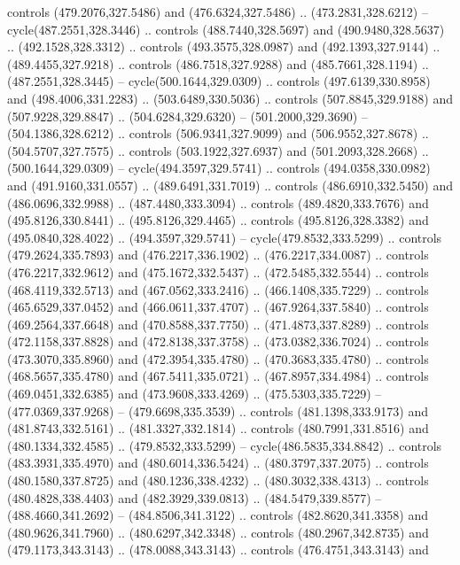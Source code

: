 \begin{scope}[cm={{1.25,0.0,0.0,-1.25,(0.0,743.43331)}}]
    controls (479.2076,327.5486) and (476.6324,327.5486) .. (473.2831,328.6212) --
    cycle(487.2551,328.3446) .. controls (488.7440,328.5697) and
    (490.9480,328.5637) .. (492.1528,328.3312) .. controls (493.3575,328.0987) and
    (492.1393,327.9144) .. (489.4455,327.9218) .. controls (486.7518,327.9288) and
    (485.7661,328.1194) .. (487.2551,328.3445) -- cycle(500.1644,329.0309) ..
    controls (497.6139,330.8958) and (498.4006,331.2283) .. (503.6489,330.5036) ..
    controls (507.8845,329.9188) and (507.9228,329.8847) .. (504.6284,329.6320) --
    (501.2000,329.3690) -- (504.1386,328.6212) .. controls (506.9341,327.9099) and
    (506.9552,327.8678) .. (504.5707,327.7575) .. controls (503.1922,327.6937) and
    (501.2093,328.2668) .. (500.1644,329.0309) -- cycle(494.3597,329.5741) ..
    controls (494.0358,330.0982) and (491.9160,331.0557) .. (489.6491,331.7019) ..
    controls (486.6910,332.5450) and (486.0696,332.9988) .. (487.4480,333.3094) ..
    controls (489.4820,333.7676) and (495.8126,330.8441) .. (495.8126,329.4465) ..
    controls (495.8126,328.3382) and (495.0840,328.4022) .. (494.3597,329.5741) --
    cycle(479.8532,333.5299) .. controls (479.2624,335.7893) and
    (476.2217,336.1902) .. (476.2217,334.0087) .. controls (476.2217,332.9612) and
    (475.1672,332.5437) .. (472.5485,332.5544) .. controls (468.4119,332.5713) and
    (467.0562,333.2416) .. (466.1408,335.7229) .. controls (465.6529,337.0452) and
    (466.0611,337.4707) .. (467.9264,337.5840) .. controls (469.2564,337.6648) and
    (470.8588,337.7750) .. (471.4873,337.8289) .. controls (472.1158,337.8828) and
    (472.8138,337.3758) .. (473.0382,336.7024) .. controls (473.3070,335.8960) and
    (472.3954,335.4780) .. (470.3683,335.4780) .. controls (468.5657,335.4780) and
    (467.5411,335.0721) .. (467.8957,334.4984) .. controls (469.0451,332.6385) and
    (473.9608,333.4269) .. (475.5303,335.7229) -- (477.0369,337.9268) --
    (479.6698,335.3539) .. controls (481.1398,333.9173) and (481.8743,332.5161) ..
    (481.3327,332.1814) .. controls (480.7991,331.8516) and (480.1334,332.4585) ..
    (479.8532,333.5299) -- cycle(486.5835,334.8842) .. controls
    (483.3931,335.4970) and (480.6014,336.5424) .. (480.3797,337.2075) .. controls
    (480.1580,337.8725) and (480.1236,338.4232) .. (480.3032,338.4313) .. controls
    (480.4828,338.4403) and (482.3929,339.0813) .. (484.5479,339.8577) --
    (488.4660,341.2692) -- (484.8506,341.3122) .. controls (482.8620,341.3358) and
    (480.9626,341.7960) .. (480.6297,342.3348) .. controls (480.2967,342.8735) and
    (479.1173,343.3143) .. (478.0088,343.3143) .. controls (476.4751,343.3143) and

\end{scope}
